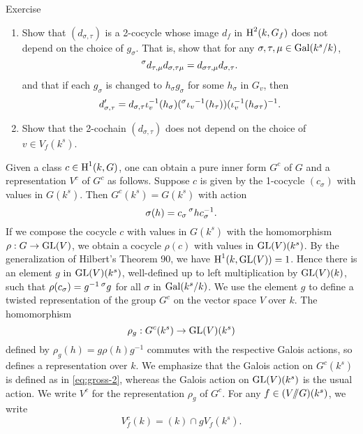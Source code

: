 \begin{enonce*}[remark]{Exercise}
\begin{enumerate}
  \item Show that $(d_{\sigma,\tau})$ is a 2-cocycle whose image $d_f$ in 
    $\operatorname{H}^2(k,G_f)$ does not depend on the choice of $g_\sigma$. That is, show 
    that for any $\sigma,\tau,\mu\in \operatorname{Gal}(k^s/k)$, 
    \[
      \prescript{\sigma}{}{d_{\tau,\mu}} d_{\sigma,\tau\mu} = d_{\sigma\tau,\mu} d_{\sigma,\tau} .
    \]
    and that if each $g_\sigma$ is changed to $h_\sigma g_\sigma$ for some 
    $h_\sigma$ in $G_v$, then 
    \[
      d_{\sigma,\tau}' = d_{\sigma,\tau} \iota_v^{-1} (h_\sigma) (\prescript{\sigma}{}{\iota_v}^{-1}(h_\tau)) (\iota_v^{-1}(h_{\sigma\tau})^{-1} .
    \]
  \item Show that the 2-cochain $(d_{\sigma,\tau})$ does not depend on the 
    choice of $v\in V_f(k^s)$. 
\end{enumerate}
\end{enonce*}

Given a class $c\in \operatorname{H}^1(k,G)$, one can obtain a pure inner form $G^c$ of $G$ 
and a representation $V^c$ of $G^c$ as follows. Suppose $c$ is given by the 
1-cocycle $(c_\sigma)$ with values in $G(k^s)$. Then $G^c(k^s) = G(k^s)$ with 
action 
\begin{equation}\label{eq:gross-2}
  \sigma(h) = c_\sigma \prescript{\sigma}{}{h} c_\sigma^{-1} .
\end{equation}
If we compose the cocycle $c$ with values in $G(k^s)$ with the homomorphism 
$\rho:G\to \operatorname{GL}(V)$, we obtain a cocycle $\rho(c)$ with values in 
$\operatorname{GL}(V)(k^s)$. By the generalization of Hilbert's Theorem 90, we 
have $\operatorname{H}^1(k,\operatorname{GL}(V))=1$. Hence there is an element $g$ in 
$\operatorname{GL}(V)(k^s)$, well-defined up to left multiplication by 
$\operatorname{GL}(V)(k)$, such that 
$\rho(c_\sigma)=g^{-1}\prescript{\sigma}{}{g}$ for all $\sigma$ in 
$\operatorname{Gal}(k^s/k)$. We use the element $g$ to define a twisted representation of 
the group $G^c$ on the vector space $V$ over $k$. The homomorphism 
\[
  \rho_g:G^c(k^s) \to \operatorname{GL}(V)(k^s) 
\]
defined by $\rho_g(h)=g \rho(h) g^{-1}$ commutes with the respective Galois 
actions, so defines a representation over $k$. We emphasize that the Galois 
action on $G^c(k^s)$ is defined as in \eqref{eq:gross-2}, whereas the Galois 
action on $\operatorname{GL}(V)(k^s)$ is the usual action. We write $V^c$ for the 
representation $\rho_g$ of $G^c$. For any $f\in (V/\!\!/ G)(k^s)$, we write 
\[
  V_f^c(k) = (k)\cap g V_f(k^s) .
\]

